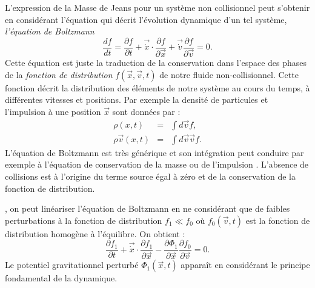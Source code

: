 L'expression de la Masse de Jeans pour un système non collisionnel peut s'obtenir en considérant l'équation qui décrit l'évolution dynamique d'un tel système, \textit{l'équation de Boltzmann}
\begin{equation}
\frac{d f}{dt}=\frac{\partial f}{\partial t}+\vec{\dot x}\cdot\frac{\partial f}{\partial \vec{x}}+\vec{\dot v}\frac{\partial f}{\partial \vec{v}}=0.
\end{equation}
Cette équation est juste la traduction de la conservation dans l'espace des phases de la \textit{fonction de distribution} $f(\vec{x},\vec{v},t)$ de notre fluide non-collisionnel. Cette fonction décrit la distribution des éléments de notre système au cours du temps, à différentes vitesses et positions. Par exemple la densité de particules  et l'impulsion à une position $\vec{x}$ sont données par :
\begin{eqnarray}
\rho(x,t)&=&\int d\vec{v} f,\\
\rho \vec{v}(x,t)&=&\int d\vec{v}\vec{v} f.
\end{eqnarray}
L'équation de Boltzmann est très générique et son intégration peut conduire par exemple à l'équation de conservation de la masse ou de l'impulsion . L'absence de collisions est à l'origine du terme source égal à zéro et de la conservation de la fonction de distribution.

, on peut linéariser l'équation de Boltzmann en ne considérant que de faibles perturbations à la fonction de distribution $f_1\ll f_0$ où $f_0(\vec{v},t)$ est la fonction de distribution homogène à l'équilibre. On obtient :
\begin{equation}
\frac{\partial f_1}{\partial t}+\vec{\dot x}\cdot\frac{\partial f_1}{\partial \vec{x}}-\frac{\partial \Phi_1}{\partial \vec{x}}\frac{\partial f_0}{\partial \vec{v}}=0.
\end{equation}
Le potentiel gravitationnel perturbé $\Phi_1(\vec{x},t)$ apparaît en considérant le principe fondamental de la dynamique.

